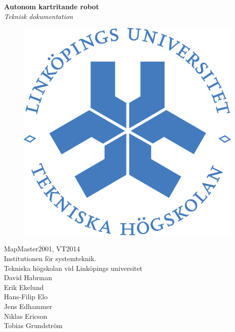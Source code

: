 \documentclass[a4paper,12pt,fleqn]{article}
\begin{document}
	\pagestyle{fancy}
	\thispagestyle{empty}
	\vspace*{\fill}
		\begingroup
			\begin{center}
				\huge{\textbf{Autonom kartritande robot}} 
				\\
				\vspace{15pt}
				\large{\emph{Teknisk dokumentation}}
				\normalsize
				\\
				\vspace{55pt}
				\begin{figure}[htp]
					\begin{center}
				  	  \includegraphics[keepaspectratio=true,scale=1.2]{bilder/linkoping.png}  %
					\end{center}
				\end{figure}
				\vspace{40pt}
				MapMaster2001, VT2014
				\\
				Institutionen för systemteknik.
				\\
				Tekniska högskolan vid Linköpings universitet
				\\
				\vspace{20 pt}
				David Habrman \\
				Erik Ekelund \\
				Hans-Filip Elo \\
				Jens Edhammer \\
				Niklas Ericson \\
				Tobias Grundström \\
			\end{center}
		\endgroup
	\vspace*{\fill}
\end{document}
